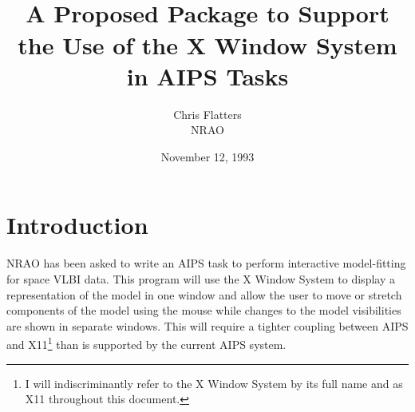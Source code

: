 
\newcommand{\memnum}{84}
\newcommand{\memtit}{A Proposed Package to Support the Use of the X
       Window System in AIPS Tasks }
\title{
   \vskip -35pt
   \fbox{AIPS Memo \memnum} \\
   \vskip 28pt
   \memtit \\}
\author{Chris Flatters\\
        NRAO}
\date{November 12, 1993}


\maketitle

\section{Introduction}

NRAO has been asked to write an AIPS task to perform interactive
model-fitting for space VLBI data.  This program will use the X Window
System to display a representation of the model in one window and
allow the user to move or stretch components of the model using the
mouse while changes to the model visibilities are shown in separate
windows.  This will require a tighter coupling between AIPS and
X11\footnote{I will indiscriminantly refer to the X Window System by
its full name and as X11 throughout this document.} than is supported
by the current AIPS system.

